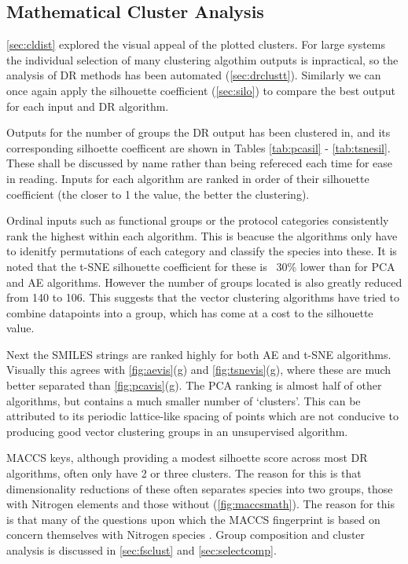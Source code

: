 \subsection{Mathematical Cluster Analysis}\label{sec:mathclustanalysis}

\autoref{sec:cldist} explored the visual appeal of the plotted clusters. For large systems the individual selection of many clustering algothim outputs is inpractical, so the analysis of DR methods has been automated (\autoref{sec:drclustt}). Similarly we can once again apply the silhouette coefficient (\autoref{sec:silo})
to compare the best output for each input and DR algorithm. 

Outputs for the number of groups the DR output has been clustered in, and its corresponding silhoette coefficent are shown in Tables \ref{tab:pcasil} - \ref{tab:tsnesil}. These shall be discussed by name rather than being refereced each time for ease in reading.  
Inputs for each algorithm are ranked in order of their silhouette coefficient (the closer to 1 the value, the better the clustering). 

Ordinal inputs such as functional groups or the protocol categories consistently rank the highest within each algorithm. This is beacuse the algorithms only have to idenitfy permutations of each category and classify the species into these. It is noted that the t-SNE silhouette coefficient for these is ~30\% lower than for PCA and AE algorithms. However the number of groups located is also greatly reduced from 140 to 106. This suggests that the vector clustering algorithms have tried to combine datapoints into a group, which has come at a cost to the silhouette value. 

Next the SMILES strings are ranked highly for both AE and t-SNE algorithms. Visually this agrees with \autoref{fig:aevis}(g) and \autoref{fig:tsnevis}(g), where these are much better separated than \autoref{fig:pcavis}(g). The PCA ranking is almost half of other algorithms, but contains a much smaller number of `clusters'. This can be attributed to its periodic lattice-like spacing of points which are not conducive to producing good vector clustering groups in an unsupervised algorithm.

MACCS keys, although providing a modest silhoette score across most DR algorithms, often only have 2 or three clusters. The reason for this is that dimensionality reductions of these often separates species into two groups, those with Nitrogen elements and those without (\autoref{fig:maccsmath}). The reason for this is that many of the questions upon which the MACCS fingerprint is based on concern themselves with Nitrogen species \cite{rdkitcode}. Group composition and cluster analysis is discussed in \autoref{sec:fsclust} and \autoref{sec:selectcomp}.\\
 
